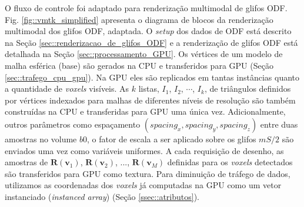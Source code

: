 O fluxo de controle foi adaptado para renderização multimodal de glifos ODF. Fig. \ref{fig::vmtk_simplified} apresenta o diagrama de blocos da renderização multimodal dos glifos ODF, adaptada. O \textit{setup} dos dados de ODF está descrito na Seção \ref{sec::renderizacao_de_glifos_ODF} e a renderização de glifos ODF está detalhada na Seção \ref{sec::processamento_GPU}. Os vértices de um modelo de malha esférica (base) são gerados na CPU e transferidos para GPU (Seção \ref{sec::trafego_cpu_gpu}). Na GPU eles são replicados em tantas instâncias quanto a quantidade de \textit{voxels} visíveis. As $k$ listas, $I_1$, $I_2$, $\cdots$, $I_k$, de triângulos definidos por vértices indexados para malhas de diferentes níveis de resolução são também construídas na CPU e transferidas para GPU uma única vez. Adicionalmente, outros parâmetros como espaçamento $(spacing_x, spacing_y, spacing_z)$ entre duas amostras no volume $b0$, o fator de escala a ser aplicado sobre os glifos $mS/2$ são enviados uma vez como variáveis uniformes. A cada requisição de desenho, as amostras de $\boldsymbol{R}(\mathbf{v}_1)$, $\boldsymbol{R}(\mathbf{v}_2)$, ...,
$\boldsymbol{R}(\mathbf{v}_M)$ definidas para os \textit{voxels} detectados são transferidos para GPU como textura. Para diminuição de tráfego de dados, utilizamos as coordenadas dos \textit{voxels} já computadas na GPU como um vetor instanciado (\textit{instanced array}) (Seção \ref{ssec::atributos}).






